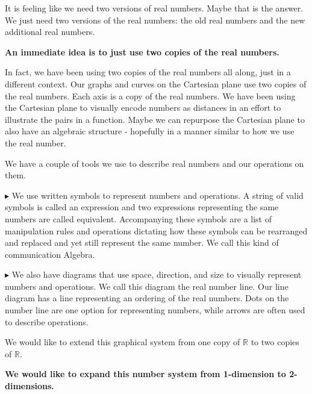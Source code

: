 \documentclass{ximera}
\begin{document}
It is feeling like we need two versions of real numbers. Maybe that is the answer. We just need two versions of the real numbers: the old real numbers and the new additional real numbers.





\begin{center}
\textbf{\textcolor{purple!85!blue}{An immediate idea is to just use two copies of the real numbers.}}
\end{center}


In fact, we have been using two copies of the real numbers all along, just in a different context. Our graphs and curves on the Cartesian plane use two copies of the real numbers.  Each axis is a copy of the real numbers. We have been using the Cartesian plane to visually encode numbers as distances in an effort to illustrate the pairs in a function. Maybe we can repurpose the Cartesian plane to also have an algebraic structure - hopefully in a manner similar to how we use the real number. 








We have a couple of tools we use to describe real numbers and our operations on them.


$\blacktriangleright$  We use written symbols to represent numbers and operations.  A string of valid symbols is called an expression and two expressions representing the same numbers are called equivalent. Accompanying these symbols are a list of manipulation rules and operations dictating how these symbols can be rearranged and replaced and yet still represent the same number.  We call this kind of communication Algebra.


$\blacktriangleright$  We also have diagrams that use space, direction, and size to visually represent numbers and operations. We call this diagram the real number line. Our line diagram has a line representing an ordering of the real numbers. Dots on the number line are one option for representing numbers, while arrows are often used to describe operations.


We would like to extend this graphical system from one copy of \textbf{$\mathbb{R}$} to two copies of \textbf{$\mathbb{R}$}. 



\begin{center}
\textbf{\textcolor{red!70!darkgray}{We would like to expand this number system from 1-dimension to 2-dimensions.}}
\end{center}
\end{document}
